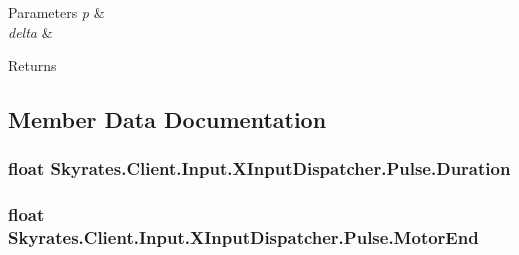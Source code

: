 \begin{DoxyParams}{Parameters}
{\em p} & \\
\hline
{\em delta} & \\
\hline
\end{DoxyParams}
\begin{DoxyReturn}{Returns}

\end{DoxyReturn}


\subsection{Member Data Documentation}
\hypertarget{class_skyrates_1_1_client_1_1_input_1_1_x_input_dispatcher_1_1_pulse_a47ce72df82bf2a4f4474d45e238d04c9}{
\subsubsection[{Duration}]{\setlength{\rightskip}{0pt plus 5cm}float Skyrates.\-Client.\-Input.\-X\-Input\-Dispatcher.\-Pulse.\-Duration}}\label{class_skyrates_1_1_client_1_1_input_1_1_x_input_dispatcher_1_1_pulse_a47ce72df82bf2a4f4474d45e238d04c9}




\hypertarget{class_skyrates_1_1_client_1_1_input_1_1_x_input_dispatcher_1_1_pulse_a636425c095036c9cf34e77404b905d37}{
\subsubsection[{Motor\-End}]{\setlength{\rightskip}{0pt plus 5cm}float Skyrates.\-Client.\-Input.\-X\-Input\-Dispatcher.\-Pulse.\-Motor\-End}}\label{class_skyrates_1_1_client_1_1_input_1_1_x_input_dispatcher_1_1_pulse_a636425c095036c9cf34e77404b905d37}




